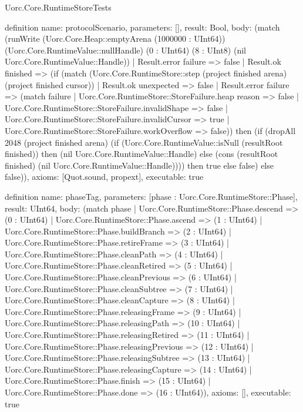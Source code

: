 \begin{lexlean}{Uorc.Core.RuntimeStoreTests}
\begin{semanticmodule}
definition{
  name: protocolScenario,
  parameters: [],
  result: Bool,
  body: (match (runWrite (Uorc.Core.Heap::emptyArena (1000000 : UInt64)) (Uorc.Core.RuntimeValue::nullHandle) (0 : UInt64) (8 : UInt8) (nil Uorc.Core.RuntimeValue::Handle))
    | Result.error failure => false
    | Result.ok finished => (if (match (Uorc.Core.RuntimeStore::step (project finished arena) (project finished cursor))
      | Result.ok unexpected => false
      | Result.error failure => (match failure
        | Uorc.Core.RuntimeStore::StoreFailure.heap reason => false
        | Uorc.Core.RuntimeStore::StoreFailure.invalidShape => false
        | Uorc.Core.RuntimeStore::StoreFailure.invalidCursor => true
        | Uorc.Core.RuntimeStore::StoreFailure.workOverflow => false)) then (if (dropAll 2048 (project finished arena) (if (Uorc.Core.RuntimeValue::isNull (resultRoot finished)) then (nil Uorc.Core.RuntimeValue::Handle) else (cons (resultRoot finished) (nil Uorc.Core.RuntimeValue::Handle)))) then true else false) else false)),
  axioms: [Quot.sound, propext],
  executable: true
}

definition{
  name: phaseTag,
  parameters: [phase : Uorc.Core.RuntimeStore::Phase],
  result: UInt64,
  body: (match phase
    | Uorc.Core.RuntimeStore::Phase.descend => (0 : UInt64)
    | Uorc.Core.RuntimeStore::Phase.ascend => (1 : UInt64)
    | Uorc.Core.RuntimeStore::Phase.buildBranch => (2 : UInt64)
    | Uorc.Core.RuntimeStore::Phase.retireFrame => (3 : UInt64)
    | Uorc.Core.RuntimeStore::Phase.cleanPath => (4 : UInt64)
    | Uorc.Core.RuntimeStore::Phase.cleanRetired => (5 : UInt64)
    | Uorc.Core.RuntimeStore::Phase.cleanPrevious => (6 : UInt64)
    | Uorc.Core.RuntimeStore::Phase.cleanSubtree => (7 : UInt64)
    | Uorc.Core.RuntimeStore::Phase.cleanCapture => (8 : UInt64)
    | Uorc.Core.RuntimeStore::Phase.releasingFrame => (9 : UInt64)
    | Uorc.Core.RuntimeStore::Phase.releasingPath => (10 : UInt64)
    | Uorc.Core.RuntimeStore::Phase.releasingRetired => (11 : UInt64)
    | Uorc.Core.RuntimeStore::Phase.releasingPrevious => (12 : UInt64)
    | Uorc.Core.RuntimeStore::Phase.releasingSubtree => (13 : UInt64)
    | Uorc.Core.RuntimeStore::Phase.releasingCapture => (14 : UInt64)
    | Uorc.Core.RuntimeStore::Phase.finish => (15 : UInt64)
    | Uorc.Core.RuntimeStore::Phase.done => (16 : UInt64)),
  axioms: [],
  executable: true
}


\end{semanticmodule}
\end{lexlean}
